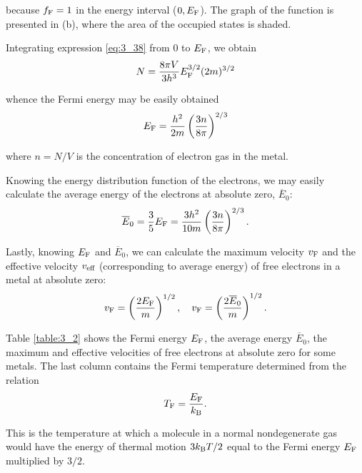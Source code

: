 \noindent
because $f_{\text{F}}=1$ in the energy interval ($0, E_{\text{F}}$). The graph of the function is presented in (b), where the area of the occupied states is shaded.

Integrating expression \eqref{eq:3_38} from $0$ to $E_{\text{F}}$, we obtain
\begin{equation*}
    N = \frac{8\pi V}{3h^3} E_{\text{F}}^{3/2} (2m)^{3/2}
\end{equation*}

\noindent
whence the Fermi energy may be easily obtained
\begin{equation}\label{eq:3_39}
    E_{\text{F}} = \frac{h^2}{2m} \left(\frac{3n}{8\pi}\right)^{2/3}
\end{equation}

\noindent
where $n=N/V$ is the concentration of electron gas in the metal.

Knowing the energy distribution function of the electrons, we may easily calculate the average energy of the electrons at absolute zero, $\overline{E}_0$:
\begin{equation}\label{eq:3_40}
    \overline{E}_0 = \frac{3}{5}E_{\text{F}} = \frac{3h^2}{10m} \left(\frac{3n}{8\pi}\right)^{2/3}.
\end{equation}

\noindent
Lastly, knowing $E_{\text{F}}$ and $\overline{E}_0$, we can calculate the maximum velocity $v_{\text{F}}$ and the effective velocity $v_{\text{eff}}$ (corresponding to average energy) of free electrons in a metal at absolute zero:
\begin{equation}\label{eq:3_41}
    v_{\text{F}} = \left(\frac{2E_{\text{F}}}{m}\right)^{1/2},\quad v_{\text{F}} = \left(\frac{2\overline{E}_0}{m}\right)^{1/2}.
\end{equation}

Table \ref{table:3_2} shows the Fermi energy $E_{\text{F}}$, the average energy $\overline{E}_0$, the maximum and effective velocities of free electrons at absolute zero for some metals. The last column contains the Fermi temperature determined from the relation
\begin{equation}\label{eq:3_42}
    T_{\text{F}} = \frac{E_{\text{F}}}{k_{\text{B}}}.
\end{equation}

\noindent
This is the temperature at which a molecule in a normal nondegenerate gas would have the energy of thermal motion $3k_{\text{B}}T/2$ equal to the Fermi energy $E_{\text{F}}$ multiplied by $3/2$.

